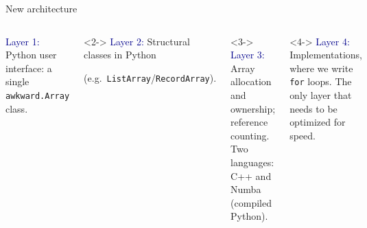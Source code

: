 \documentclass[aspectratio=169]{beamer}
\begin{document}
\begin{frame}{New architecture}
\large
\vspace{0.5 cm}
\begin{columns}
\vspace{-0.2 cm}

\textcolor{darkblue}{Layer 1:} Python user interface: a single \texttt{awkward.Array} class.
\vspace{\baselineskip}

\vspace{0.18 cm}
\begin{uncoverenv}<2->
\textcolor{darkblue}{Layer 2:} Structural classes in Python

(e.g.\ \texttt{ListArray}/\texttt{RecordArray}).
\end{uncoverenv}
\vspace{\baselineskip}

\vspace{0.18 cm}
\begin{uncoverenv}<3->
\textcolor{darkblue}{Layer 3:} Array allocation and ownership; reference counting. Two languages: C++ and Numba (compiled Python).
\end{uncoverenv}
\vspace{\baselineskip}

\vspace{0.18 cm}
\begin{uncoverenv}<4->
\textcolor{darkblue}{Layer 4:} Implementations, where we write \texttt{for} loops. The only layer that needs to be optimized for speed.
\end{uncoverenv}

\includegraphics[width=\linewidth]{awkward-1-0-layers.pdf}
\end{columns}
\end{frame}
\end{document}

